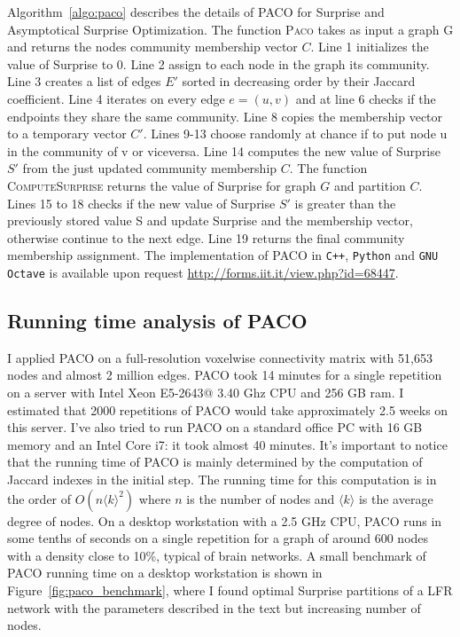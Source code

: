 Algorithm~\ref{algo:paco} describes the details of PACO for Surprise and Asymptotical Surprise Optimization.
The function \textsc{Paco} takes as input a graph G and returns the nodes community membership vector $C$.
Line 1 initializes the value of Surprise to 0.
Line 2 assign to each node in the graph its community.
Line 3 creates a list of edges $E'$ sorted in decreasing order by their Jaccard coefficient.
Line 4 iterates on every edge $e=(u,v)$ and at line 6 checks if the endpoints they share the same community.
Line 8 copies the membership vector to a temporary vector $C'$.
Lines 9-13 choose randomly at chance if to put node u in the community of v or viceversa.
Line 14 computes the new value of Surprise $S'$ from the just updated community membership $C$.
The function \textsc{ComputeSurprise} returns the value of Surprise for graph $G$ and partition $C$.
Lines 15 to 18 checks if the new value of Surprise $S'$ is greater than the previously stored value S and update Surprise and the membership vector, otherwise continue to the next edge.
Line 19 returns the final community membership assignment.
The implementation of PACO in \texttt{C++}, \texttt{Python} and \texttt{GNU Octave} is available upon request \url{http://forms.iit.it/view.php?id=68447}.


\subsection{Running time analysis of PACO}
I applied PACO on a full-resolution voxelwise connectivity matrix with 51,653 nodes and almost 2 million edges.
PACO took 14 minutes for a single repetition on a server with Intel Xeon E5-2643@ 3.40 Ghz CPU and 256 GB ram.
I estimated that 2000 repetitions of PACO would take approximately 2.5 weeks on this server.
I've also tried to run PACO on a standard office PC with 16 GB memory and an Intel Core i7: it took almost 40 minutes.
It's important to notice that the running time of PACO is mainly determined by the computation of Jaccard indexes in the initial step.
The running time for this computation is in the order of $O(n\langle k \rangle^2)$ where $n$ is the number of nodes and $\langle k \rangle$ is the average degree of nodes.
On a desktop workstation with a 2.5 GHz CPU, PACO runs in some tenths of seconds on a single repetition for a graph of around 600 nodes with a density close to 10\%, typical of brain networks.
A small benchmark of PACO running time on a desktop workstation is shown in Figure~\ref{fig:paco_benchmark}, where I found optimal Surprise partitions of a LFR network with the parameters described in the text but increasing number of nodes.

